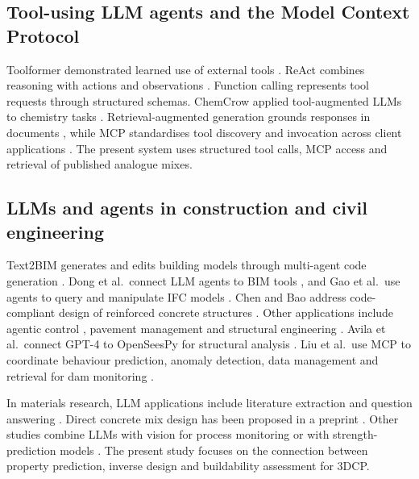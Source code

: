 \documentclass[preprint,12pt]{elsarticle}
\begin{document}
\subsection{Tool-using LLM agents and the Model Context Protocol}

Toolformer demonstrated learned use of external tools \cite{schick2023toolformer}. ReAct combines reasoning with actions and observations \cite{yao2023react}. Function calling represents tool requests through structured schemas. ChemCrow applied tool-augmented LLMs to chemistry tasks \cite{bran2024chemcrow}. Retrieval-augmented generation grounds responses in documents \cite{gao2023rag}, while MCP standardises tool discovery and invocation across client applications \cite{anthropic2024mcp,hou2025mcp}. The present system uses structured tool calls, MCP access and retrieval of published analogue mixes.

\subsection{LLMs and agents in construction and civil engineering}

Text2BIM generates and edits building models through multi-agent code generation \cite{du2026text2bim}. Dong et al.\ connect LLM agents to BIM tools \cite{dong2025aibim}, and Gao et al.\ use agents to query and manipulate IFC models \cite{gao2026ifcagent}. Chen and Bao address code-compliant design of reinforced concrete structures \cite{chen2025multiagentrc}. Other applications include agentic control \cite{ren2026agenticontrol}, pavement management \cite{zeng2026pavementagents} and structural engineering \cite{liang2026llmstructural}. Avila et al.\ connect GPT-4 to OpenSeesPy for structural analysis \cite{avila2025hai}. Liu et al.\ use MCP to coordinate behaviour prediction, anomaly detection, data management and retrieval for dam monitoring \cite{liu2026llm4shm}.

In materials research, LLM applications include literature extraction \cite{dagdelen2024structured,polak2024extracting,jablonka2023fourteen,li2026llmconcreteextraction} and question answering \cite{li2024chatgptunderground}. Direct concrete mix design has been proposed in a preprint \cite{volker2024llmconcrete}. Other studies combine LLMs with vision for process monitoring \cite{li2025concretevibrationllm} or with strength-prediction models \cite{zaman2026concretellm}. The present study focuses on the connection between property prediction, inverse design and buildability assessment for 3DCP.
\end{document}
